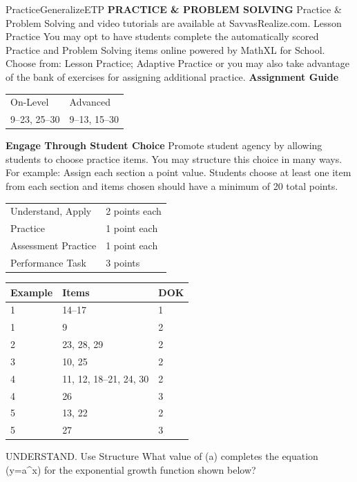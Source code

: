 \documentclass{article}
\newenvironment{item-analysis}{}{}      %
\newenvironment{practice}[2]{}{}        %
\newenvironment{te-addendum}[2]{}{}     %
\newcommand{\answer}[1]{}               %
\newcommand{\placeholder}[2]{}          %
\newcommand{\te}[1]{}                   %
\begin{document}
\begin{te-addendum}{Practice}{GeneralizeETP}
\textbf{PRACTICE \& PROBLEM SOLVING}
Practice \& Problem Solving and video tutorials are available at SavvasRealize.com.
Lesson Practice You may opt to have students complete the automatically scored Practice and Problem Solving items online powered by MathXL for School.
Choose from: Lesson Practice; Adaptive Practice
or you may also take advantage of the bank of exercises for assigning additional practice.
\textbf{Assignment Guide}
\begin{tabular}{ll}
On-Level & Advanced \\
9--23, 25--30 & 9--13, 15--30 \\
\end{tabular}
\textbf{Engage Through Student Choice}
Promote student agency by allowing students to choose practice items. You may structure this choice in many ways.
For example:
Assign each section a point value. Students choose at least one item from each section and items chosen should have a minimum of 20 total points.
\begin{tabular}{ll}
Understand, Apply & 2 points each \\
Practice & 1 point each \\
Assessment Practice & 1 point each \\
Performance Task & 3 points \\
\end{tabular}
\te{Scan the QR code to access a video tutorial. See answers for 16--20, 25--26 on the next page.}
\end{te-addendum}
\begin{item-analysis}
\begin{tabular}{lll}
\toprule
Example & Items & DOK \\
\midrule
1 & 14--17 & 1 \\
1 & 9 & 2 \\
2 & 23, 28, 29 & 2 \\
3 & 10, 25 & 2 \\
4 & 11, 12, 18--21, 24, 30 & 2 \\
4 & 26 & 3 \\
5 & 13, 22 & 2 \\
5 & 27 & 3 \\
\bottomrule
\end{tabular}
\end{item-analysis}
\begin{practice}{9}{2}
UNDERSTAND. Use Structure What value of (a) completes the equation (y=a^x) for the exponential growth function shown below?
\placeholder{graph}{Red exponential growth curve through (0,4), approaching x-axis on left, arrows left and top. x,y axes with positive arrows, O at origin; x/y window -10 to 10, grid spacing 2, labels -8,-4,4,8.}
\answer{4}
\end{practice}
\end{document}
